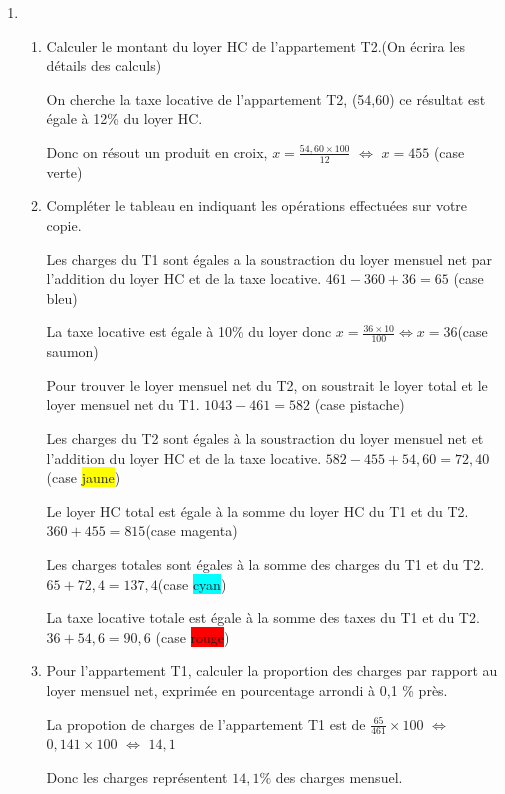 \documentclass[12pt,a4paper]{article}
\theoremstyle{break}
\begin{document}
	\begin{enumerate}
		\item 
		\begin{enumerate}
			\item Calculer le montant du loyer HC de l’appartement T2.(On écrira les détails des calculs)\par
			On cherche la taxe locative de l'appartement T2, (54,60) ce résultat est égale à 12\% du loyer HC.\par
			Donc on résout un produit en croix, $x = \frac{54,60\times 100}{12}$ $\Leftrightarrow$ $x = 455$ (case \colorbox{green!85}{verte})\par

			\item Compléter le tableau en indiquant les opérations effectuées sur votre copie.\par
			Les charges du T1 sont égales a la soustraction du loyer mensuel net par l'addition du loyer HC et de la taxe locative. $461-360+36 = 65$ (case \colorbox{blue!50}{bleu})\par
			La taxe locative est égale à 10\% du loyer donc $x = \frac {36\times 10}{100} \Leftrightarrow x = 36$(case \colorbox{red!45}{saumon})\par
			Pour trouver le loyer mensuel net du T2, on soustrait le loyer total et le loyer mensuel net du T1. $1043-461 = 582$ (case \colorbox{green!25}{pistache})\par
			Les charges du T2 sont égales à la soustraction du loyer mensuel net et l'addition du loyer HC et de la taxe locative. $582-455+54,60 = 72,40$(case \colorbox{yellow}{jaune})\par
			Le loyer HC total est égale à la somme du loyer HC du T1 et du T2. $360+455 = 815$(case \colorbox{magenta!90}{magenta})\par
			Les charges totales sont égales à la somme des charges du T1 et du T2. $65+72,4 = 137,4$(case \colorbox{cyan}{cyan})\par
			La taxe locative totale est égale à la somme des taxes du T1 et du T2. $36+54,6 = 90,6$ (case \colorbox{red}{rouge})\par

			\item Pour l’appartement T1, calculer la proportion des charges par rapport au loyer mensuel
			net, exprimée en pourcentage arrondi à 0,1 \% près.\par
			La propotion de charges de l'appartement T1 est de $\frac{65}{461}\times 100 $ $\Leftrightarrow$ $ 0,141 \times 100 $ $\Leftrightarrow$ $ 14,1$\par
			Donc les charges représentent $14,1\%$ des charges mensuel.
			

\end{enumerate}
\end{enumerate}
\end{document}
